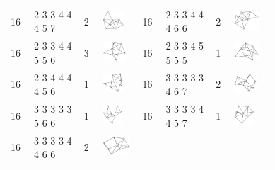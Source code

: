 \begin{footnotesize}
\begin{longtable}{
        m{0.05\linewidth} m{0.15\linewidth} m{0.05\linewidth} m{0.12\linewidth} |
        m{0.05\linewidth} m{0.15\linewidth} m{0.05\linewidth} m{0.12\linewidth}
    }
16 & 2 3 3 4 4 4 5 7 & 2 & \includegraphics[height=0.7151cm]{15-universal-graphs/img/degree-sequences-example-graphs/graph-4-8-142} &
16 & 2 3 3 4 4 4 6 6 & 2 & \includegraphics[height=0.7151cm]{15-universal-graphs/img/degree-sequences-example-graphs/graph-4-8-143}\\
16 & 2 3 3 4 4 5 5 6 & 3 & \includegraphics[height=0.7151cm]{15-universal-graphs/img/degree-sequences-example-graphs/graph-4-8-144} &
16 & 2 3 3 4 5 5 5 5 & 1 & \includegraphics[height=0.7151cm]{15-universal-graphs/img/degree-sequences-example-graphs/graph-4-8-145}\\
16 & 2 3 4 4 4 4 5 6 & 1 & \includegraphics[height=0.7151cm]{15-universal-graphs/img/degree-sequences-example-graphs/graph-4-8-146} &
16 & 3 3 3 3 3 4 6 7 & 2 & \includegraphics[height=0.7151cm]{15-universal-graphs/img/degree-sequences-example-graphs/graph-4-8-147}\\
16 & 3 3 3 3 3 5 6 6 & 1 & \includegraphics[height=0.7151cm]{15-universal-graphs/img/degree-sequences-example-graphs/graph-4-8-148} &
16 & 3 3 3 3 4 4 5 7 & 1 & \includegraphics[height=0.7151cm]{15-universal-graphs/img/degree-sequences-example-graphs/graph-4-8-149}\\
16 & 3 3 3 3 4 4 6 6 & 2 & \includegraphics[height=0.7151cm]{15-universal-graphs/img/degree-sequences-example-graphs/graph-4-8-150} &

\end{longtable}
\end{footnotesize}
